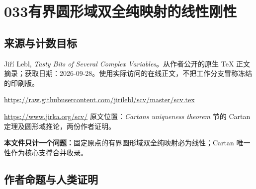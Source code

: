 \documentclass[UTF8,11pt]{ctexart}
\theoremstyle{definition}
\begin{document}
\section*{033\quad 有界圆形域双全纯映射的线性刚性}
\subsection*{来源与计数目标}
Ji\v{r}\'i Lebl, \emph{Tasty Bits of Several Complex Variables}。从作者公开的原生 TeX 正文摘录；获取日期：2026-09-28。使用实际访问的在线正文，不把工作分支冒称冻结的印刷版。
\par\url{https://raw.githubusercontent.com/jirilebl/scv/master/scv.tex}
\par\url{https://www.jirka.org/scv/}
原文位置：\emph{Cartan\textquotesingle s uniqueness theorem} 节的 Cartan 定理及圆形域推论，两份作者证明。
\par\textbf{本文件只计一个问题：}固定原点的有界圆形域双全纯映射必为线性；Cartan 唯一性作为核心支撑合并收录。
\subsection*{作者命题与人类证明}
\end{document}
